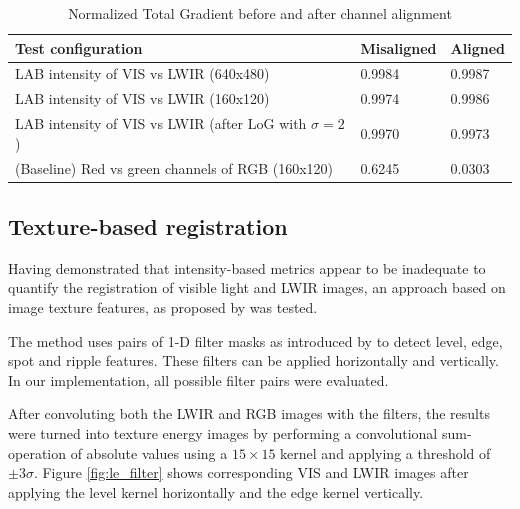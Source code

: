 \documentclass{l4proj}
\begin{document}
\begin{table}[ht]
  \centering
  \begin{tabular}{@{}lll@{}}
  \toprule
  \textbf{Test configuration}                             & \textbf{Misaligned} & \textbf{Aligned} \\ \midrule
  LAB intensity of VIS vs LWIR (640x480)     & 0.9984              & 0.9987           \\
  LAB intensity of VIS vs LWIR (160x120)    & 0.9974              & 0.9986           \\
  LAB intensity of VIS vs LWIR (after LoG with $\sigma=2$) & 0.9970              & 0.9973           \\
  (Baseline) Red vs green channels of RGB (160x120)                  & 0.6245              & 0.0303           \\ \bottomrule
  \end{tabular}
  \caption{Normalized Total Gradient before and after channel alignment}
  \label{table:registration_ntg}
\end{table}


\subsection{Texture-based registration}

Having demonstrated that intensity-based metrics appear to be inadequate to quantify the registration of visible light and LWIR images, an approach based on image texture features, as proposed by \citet{jarc_graz_2007} was tested. 

The method uses pairs of 1-D filter masks as introduced by \citet{laws_rapid_1980} to detect level, edge, spot and ripple features. These filters can be applied horizontally and vertically. In our implementation, all possible filter pairs were evaluated.

After convoluting both the LWIR and RGB images with the filters, the results were turned into texture energy images by performing a convolutional sum-operation of absolute values using a $15 \times 15$ kernel and applying a threshold of $\pm 3 \sigma$. Figure \ref{fig:le_filter} shows corresponding VIS and LWIR images after applying the level kernel horizontally and the edge kernel vertically.
\end{document}

